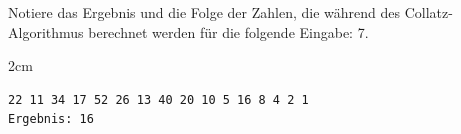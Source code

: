 \question[3]
Notiere das Ergebnis und die Folge der Zahlen, die während des Collatz-Algorithmus berechnet werden
für die folgende Eingabe: 7.

\begin{solutionbox}{2cm}
\begin{lstlisting}
22 11 34 17 52 26 13 40 20 10 5 16 8 4 2 1
Ergebnis: 16
\end{lstlisting}
\end{solutionbox}
